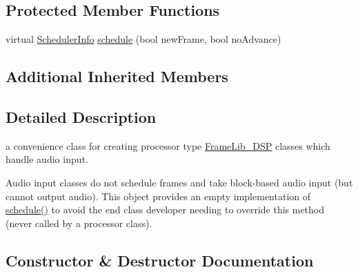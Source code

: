 \subsection*{Protected Member Functions}
\begin{DoxyCompactItemize}
\item 
virtual \hyperlink{struct_frame_lib___d_s_p_1_1_scheduler_info}{Scheduler\+Info} \hyperlink{class_frame_lib___audio_input_aaa16c1cb4486b196362b5edf1c60f689}{schedule} (bool new\+Frame, bool no\+Advance)
\end{DoxyCompactItemize}
\subsection*{Additional Inherited Members}


\subsection{Detailed Description}
a convenience class for creating processor type \hyperlink{class_frame_lib___d_s_p}{Frame\+Lib\+\_\+\+D\+SP} classes which handle audio input. 

Audio input classes do not schedule frames and take block-\/based audio input (but cannot output audio). This object provides an empty implementation of \hyperlink{class_frame_lib___audio_input_aaa16c1cb4486b196362b5edf1c60f689}{schedule()} to avoid the end class developer needing to override this method (never called by a processor class). 

\subsection{Constructor \& Destructor Documentation}
\mbox{\label{class_frame_lib___audio_input_a8ea6d703ceb96e95716c8d28a5a91f90}} 
